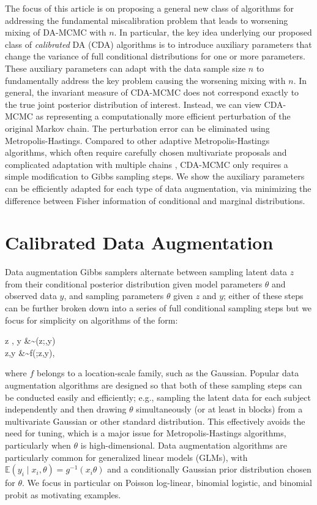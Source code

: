 \documentclass[12pt]{article}
\newcommand{\be}{\begin{equs}}
\newcommand{\ee}{\end{equs}}
\newcommand{\bb}[1]{\mathbb{#1}}
\begin{document}
{The focus of this article is on proposing a general new class of algorithms for addressing the fundamental miscalibration problem that leads to worsening mixing of  DA-MCMC with $n$.  In particular, the key idea underlying our proposed class of {\em calibrated} DA (CDA) algorithms is to introduce auxiliary parameters that change the variance of full conditional distributions for one or more parameters. These auxiliary parameters can adapt with the data sample size $n$ to fundamentally address the key problem causing the worsening mixing with $n$.  In general, the invariant measure of CDA-MCMC does not correspond exactly to the true joint posterior distribution of interest. Instead, we can view CDA-MCMC as representing a computationally more efficient perturbation of the original Markov chain. { The perturbation error can be eliminated using Metropolis-Hastings. Compared to other adaptive Metropolis-Hastings algorithms,
which often require carefully chosen multivariate proposals and complicated adaptation with multiple chains  \citep{tran2016adaptive}, CDA-MCMC only
requires a simple modification to Gibbs sampling steps. We show the auxiliary parameters can be efficiently adapted for each type of data augmentation, via minimizing
the difference between Fisher information of conditional and
marginal distributions.}}


\section{Calibrated Data Augmentation} \label{sec:cda}
Data augmentation Gibbs samplers alternate between sampling  latent data $z$ from their conditional posterior distribution given model parameters $\theta$ and observed data $y$, and sampling parameters $\theta$ given $z$ and $y$; either of these steps can be further broken down into a series of full conditional sampling steps but we focus for simplicity on algorithms of the form: 
\be \label{eq:da}
z \mid \theta, y &\sim \pi(z;\theta,y) \\
\theta \mid z,y &\sim f(\theta;z,y),
\ee
where $f$ belongs to a location-scale family, such as the Gaussian.  Popular data augmentation algorithms are designed so that both of these sampling steps can be conducted easily and efficiently; e.g., sampling the latent data for each subject independently and then drawing $\theta$ simultaneously (or at least in blocks) from a multivariate Gaussian or other standard distribution.  This effectively avoids the need for tuning, which is a major issue for Metropolis-Hastings algorithms, particularly when $\theta$ is high-dimensional.
Data augmentation algorithms are particularly common for generalized linear models (GLMs), with $\bb E(y_i \mid x_i, \theta) = g^{-1}(x_i \theta)$ and a conditionally Gaussian prior distribution chosen for $\theta$. We focus in particular on Poisson log-linear, binomial logistic, and binomial probit as motivating examples.
\end{document}
